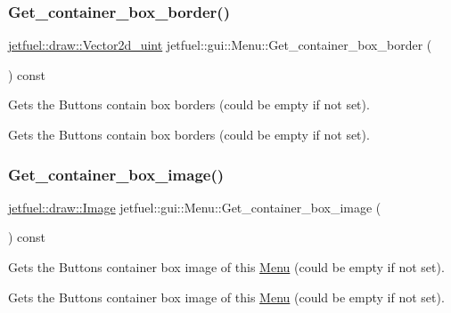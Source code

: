 \subsubsection{\texorpdfstring{Get\+\_\+container\+\_\+box\+\_\+border()}{Get\_container\_box\_border()}}
{\footnotesize\ttfamily \hyperlink{classjetfuel_1_1draw_1_1Vector2d}{jetfuel\+::draw\+::\+Vector2d\+\_\+uint} jetfuel\+::gui\+::\+Menu\+::\+Get\+\_\+container\+\_\+box\+\_\+border (\begin{DoxyParamCaption}{ }\end{DoxyParamCaption}) const\hspace{0.3cm}{\ttfamily [inline]}}



Gets the Buttons\textquotesingle{} contain box borders (could be empty if not set). 

Gets the Buttons\textquotesingle{} contain box borders (could be empty if not set). \mbox{\label{classjetfuel_1_1gui_1_1Menu_a6657e617308d99482c12f544fb88173c}} 
\subsubsection{\texorpdfstring{Get\+\_\+container\+\_\+box\+\_\+image()}{Get\_container\_box\_image()}}
{\footnotesize\ttfamily \hyperlink{classjetfuel_1_1draw_1_1Image}{jetfuel\+::draw\+::\+Image} jetfuel\+::gui\+::\+Menu\+::\+Get\+\_\+container\+\_\+box\+\_\+image (\begin{DoxyParamCaption}{ }\end{DoxyParamCaption}) const\hspace{0.3cm}{\ttfamily [inline]}}



Gets the Buttons\textquotesingle{} container box image of this \hyperlink{classjetfuel_1_1gui_1_1Menu}{Menu} (could be empty if not set). 

Gets the Buttons\textquotesingle{} container box image of this \hyperlink{classjetfuel_1_1gui_1_1Menu}{Menu} (could be empty if not set). \mbox{\label{classjetfuel_1_1gui_1_1Menu_a9610775609d7243a9b4ac0c6e57a7aa3}} 
